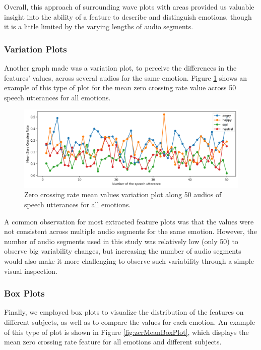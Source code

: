 Overall, this approach of surrounding wave plots with areas provided us valuable insight into the ability of a feature to describe and distinguish emotions, though it is a little limited by the varying lengths of audio segments.

\subsubsection{Variation Plots}

Another graph made was a variation plot, to perceive the differences in the features' values, across several audios for the same emotion. Figure \ref{fig:zcrMeanVar} shows an example of this type of plot for the mean zero crossing rate value across 50 speech utterances for all emotions.

\begin{figure}[H]
	\centering
	\includegraphics[width=\linewidth]{figs/4_1_traditional/meanZCRVar.png}
	\caption{Zero crossing rate mean values variation plot along 50 audios of speech utterances for all emotions.}
	\label{fig:zcrMeanVar}
\end{figure}

A common observation for most extracted feature plots was that the values were not consistent across multiple audio segments for the same emotion. However, the number of audio segments used in this study was relatively low (only 50) to observe big variability changes, but increasing the number of audio segments would also make it more challenging to observe such variability through a simple visual inspection.

\subsubsection{Box Plots}

Finally, we employed box plots to visualize the distribution of the features on different subjects, as well as to compare the values for each emotion. An example of this type of plot is shown in Figure \ref{fig:zcrMeanBoxPlot}, which displays the mean zero crossing rate feature for all emotions and different subjects. 

